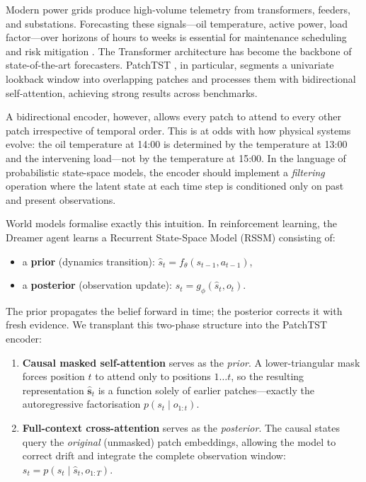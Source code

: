 \documentclass[conference]{IEEEtran}
\begin{document}
Modern power grids produce high-volume telemetry from transformers, feeders, and substations. Forecasting these signals---oil temperature, active power, load factor---over horizons of hours to weeks is essential for maintenance scheduling and risk mitigation \cite{b_grid1}. The Transformer architecture \cite{b_transformer} has become the backbone of state-of-the-art forecasters. PatchTST \cite{b_patchtst}, in particular, segments a univariate lookback window into overlapping patches and processes them with bidirectional self-attention, achieving strong results across benchmarks.

A bidirectional encoder, however, allows every patch to attend to every other patch irrespective of temporal order. This is at odds with how physical systems evolve: the oil temperature at 14:00 is determined by the temperature at 13:00 and the intervening load---not by the temperature at 15:00. In the language of probabilistic state-space models, the encoder should implement a \emph{filtering} operation where the latent state at each time step is conditioned only on past and present observations.

World models formalise exactly this intuition. In reinforcement learning, the Dreamer agent \cite{b_dreamer} learns a Recurrent State-Space Model (RSSM) consisting of:
\begin{itemize}
    \item a \textbf{prior} (dynamics transition): $\hat{s}_t = f_\theta(s_{t-1}, a_{t-1})$,
    \item a \textbf{posterior} (observation update): $s_t = g_\phi(\hat{s}_t, o_t)$.
\end{itemize}
The prior propagates the belief forward in time; the posterior corrects it with fresh evidence. We transplant this two-phase structure into the PatchTST encoder:

\begin{enumerate}
    \item \textbf{Causal masked self-attention} serves as the \emph{prior}. A lower-triangular mask forces position $t$ to attend only to positions $1 \ldots t$, so the resulting representation $\hat{\mathbf{s}}_t$ is a function solely of earlier patches---exactly the autoregressive factorisation $p(s_t \mid o_{1:t})$.
    \item \textbf{Full-context cross-attention} serves as the \emph{posterior}. The causal states query the \emph{original} (unmasked) patch embeddings, allowing the model to correct drift and integrate the complete observation window: $s_t = p(s_t \mid \hat{s}_t, o_{1:T})$.
\end{enumerate}
\end{document}
